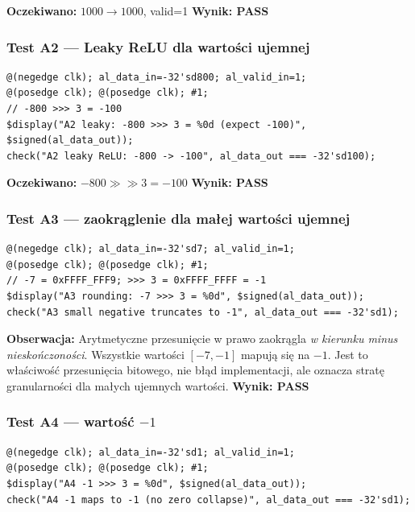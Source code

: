 \documentclass[12pt,a4paper]{article}
\begin{document}
\textbf{Oczekiwano:} $1000 \to 1000$, valid=1 \quad \textbf{Wynik: PASS}

\subsubsection*{Test A2 — Leaky ReLU dla wartości ujemnej}

\begin{lstlisting}
@(negedge clk); al_data_in=-32'sd800; al_valid_in=1;
@(posedge clk); @(posedge clk); #1;
// -800 >>> 3 = -100
$display("A2 leaky: -800 >>> 3 = %0d (expect -100)", $signed(al_data_out));
check("A2 leaky ReLU: -800 -> -100", al_data_out === -32'sd100);
\end{lstlisting}

\textbf{Oczekiwano:} $-800 \gg\gg 3 = -100$ \quad \textbf{Wynik: PASS}

\subsubsection*{Test A3 — zaokrąglenie dla małej wartości ujemnej}

\begin{lstlisting}
@(negedge clk); al_data_in=-32'sd7; al_valid_in=1;
@(posedge clk); @(posedge clk); #1;
// -7 = 0xFFFF_FFF9; >>> 3 = 0xFFFF_FFFF = -1
$display("A3 rounding: -7 >>> 3 = %0d", $signed(al_data_out));
check("A3 small negative truncates to -1", al_data_out === -32'sd1);
\end{lstlisting}

\begin{infobox}
\textbf{Obserwacja:} Arytmetyczne przesunięcie w prawo zaokrągla \textit{w kierunku minus nieskończoności}. Wszystkie wartości $[-7, -1]$ mapują się na $-1$. Jest to właściwość przesunięcia bitowego, nie błąd implementacji, ale oznacza stratę granularności dla małych ujemnych wartości. \textbf{Wynik: PASS}
\end{infobox}

\subsubsection*{Test A4 — wartość $-1$}

\begin{lstlisting}
@(negedge clk); al_data_in=-32'sd1; al_valid_in=1;
@(posedge clk); @(posedge clk); #1;
$display("A4 -1 >>> 3 = %0d", $signed(al_data_out));
check("A4 -1 maps to -1 (no zero collapse)", al_data_out === -32'sd1);
\end{lstlisting}
\end{document}
